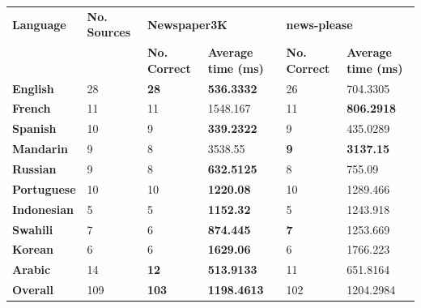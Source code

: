 \documentclass{l4proj}
\begin{document}
\begin{table}[]
\begin{tabular}{llllll}
\hline
\textbf{Language}   & \textbf{No. Sources} & \multicolumn{2}{l}{\textbf{Newspaper3K}}                 & \multicolumn{2}{l}{\textbf{news-please}}                 \\ \cline{3-6} 
\textbf{}           & \textbf{}            & \textbf{No. Correct} & \textbf{Average time (ms)} & \textbf{No. Correct} & \textbf{Average time (ms)} \\ \hline
\textbf{English}    & 28                   & \textbf{28}          & \textbf{536.3332}                 & 26                   & 704.3305                          \\
\textbf{French}     & 11                   & 11                   & 1548.167                          & 11                   & \textbf{806.2918}                 \\
\textbf{Spanish}    & 10                   & 9                    & \textbf{339.2322}                 & 9                    & 435.0289                          \\
\textbf{Mandarin}   & 9                    & 8                    & 3538.55                           & \textbf{9}           & \textbf{3137.15}                  \\
\textbf{Russian}    & 9                    & 8                    & \textbf{632.5125}                 & 8                    & 755.09                            \\
\textbf{Portuguese} & 10                   & 10                   & \textbf{1220.08}                  & 10                   & 1289.466                          \\
\textbf{Indonesian} & 5                    & 5                    & \textbf{1152.32}                  & 5                    & 1243.918                          \\
\textbf{Swahili}    & 7                    & 6                    & \textbf{874.445}                  & \textbf{7}           & 1253.669                          \\
\textbf{Korean}     & 6                    & 6                    & \textbf{1629.06}                  & 6                    & 1766.223                          \\
\textbf{Arabic}     & 14                   & \textbf{12}          & \textbf{513.9133}                 & 11                   & 651.8164                          \\ \hline
\textbf{Overall}    & 109                  & \textbf{103}         & \textbf{1198.4613}                & 102                  & 1204.2984                         \\ \hline

\end{tabular}
\end{table}
\end{document}
